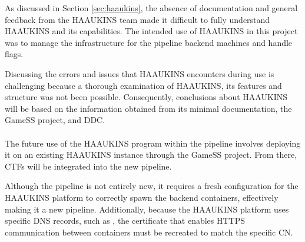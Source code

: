 As discussed in Section \ref{sec:haaukins}, the absence of documentation and general feedback from the \ac{HAAUKINS} team
made it difficult to fully understand \ac{HAAUKINS} and its capabilities.
The intended use of \ac{HAAUKINS} in this project was to manage the infrastructure for the pipeline backend machines and handle flags.

Discussing the errors and issues that \ac{HAAUKINS} encounters during use is challenging because a 
thorough examination of \ac{HAAUKINS}, its features and structure was not been possible.
Consequently, conclusions about \ac{HAAUKINS} will be based on the information obtained 
from its minimal documentation, the GameSS project, and \ac{DDC}.\\\\
The future use of the \ac{HAAUKINS} program within the pipeline involves deploying 
it on an existing \ac{HAAUKINS} instance through the GameSS project. 
From there, CTFs will be integrated into the new pipeline.

Although the pipeline is not entirely new, it requires a fresh configuration for the \ac{HAAUKINS} platform to correctly spawn the backend containers, 
effectively making it a new pipeline. Additionally, because the \ac{HAAUKINS} platform uses specific DNS records, such as , 
the certificate that enables \ac{HTTPS} communication between containers must be recreated to match the specific  \ac{CN}.